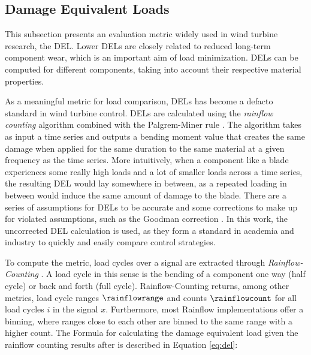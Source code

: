 \subsection{Damage Equivalent Loads}
\label{section:damage-equivalent-loads}

\begin{summary}
This subsection presents an evaluation metric widely used in wind turbine research, the \acf{DEL}. Lower \acsp{DEL} are closely related to reduced long-term component wear, which is an important aim of load minimization. DELs can be computed for different components, taking into account their respective material properties.
\end{summary}

As a meaningful metric for load comparison, \acfp{DEL} has become a defacto standard in wind turbine control. \acp{DEL} are calculated using the \textit{rainflow counting} algorithm \cite{matsuichiFatigueMetalsSubjected1968} combined with the Palgrem-Miner rule \cite{minerCumulativeDamageFatigue1945}. The algorithm takes as input a time series and outputs a bending moment value that creates the same damage when applied for the same duration to the same material at a given frequency as the time series. More intuitively, when a component like a blade experiences some really high loads and a lot of smaller loads across a time series, the resulting DEL would lay somewhere in between, as a repeated loading in between would induce the same amount of damage to the blade. There are a series of assumptions for DELs to be accurate and some corrections to make up for violated assumptions, such as the Goodman correction \cite[Equation 29]{haymanMLifeTheoryManual2012}. In this work, the uncorrected \ac{DEL} calculation is used, as they form a standard in academia and industry to quickly and easily compare control strategies.

To compute the metric, load cycles over a signal are extracted through \textit{Rainflow-Counting} \cite{matsuichiFatigueMetalsSubjected1968}. A load cycle in this sense is the bending of a component one way (half cycle) or back and forth (full cycle). Rainflow-Counting returns, among other metrics, load cycle ranges $\rainflowrange$ and counts $\rainflowcount$ for all load cycles $i$ in the signal $x$. Furthermore, most Rainflow implementations offer a binning, where ranges close to each other are binned to the same range with a higher count. The Formula for calculating the damage equivalent load given the rainflow counting results after \citet[Equation 26, 30]{haymanMLifeTheoryManual2012} is described in Equation \ref{eq:del}:

